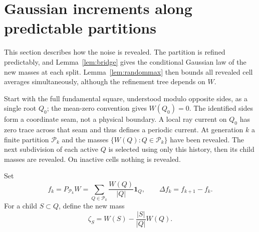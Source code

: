 \documentclass[11pt]{article}
\theoremstyle{definition}
\theoremstyle{remark}
\numberwithin{equation}{section}
\newcommand{\pr}{\mathcal P}
\newcommand{\one}{\mathbf 1}
\begin{document}
\section{Gaussian increments along predictable partitions}\label{sec:innovation}

This section describes how the noise is revealed. The partition is
refined predictably, and Lemma~\ref{lem:bridge} gives the conditional
Gaussian law of the new masses at each split. Lemma~\ref{lem:randommax}
then bounds all revealed cell averages simultaneously, although the
refinement tree depends on $W$.

\label{not:predictabletree}
Start with the full fundamental square, understood modulo opposite sides, as a
single root $Q_0$; the mean-zero convention gives $W(Q_0)=0$. The identified
sides form a coordinate seam, not a physical boundary. A local ray current on $Q_0$ has zero
trace across that seam and thus defines a periodic current. At generation $k$ a
finite partition $\pr_k$ and the masses $\{W(Q):Q\in\pr_k\}$ have been revealed.
The next subdivision of each active $Q$ is selected using only this history,
then its child masses are revealed. On inactive cells nothing is revealed.

\label{not:adaptiveprojection}
Set
\[
 f_k=P_{\pr_k}W=\sum_{Q\in\pr_k}\frac{W(Q)}{|Q|}\one_Q,
 \qquad \Delta f_k=f_{k+1}-f_k.
\]
For a child $S\subset Q$, define the new mass
\[
 \zeta_S=W(S)-\frac{|S|}{|Q|}W(Q).
\]
\end{document}
